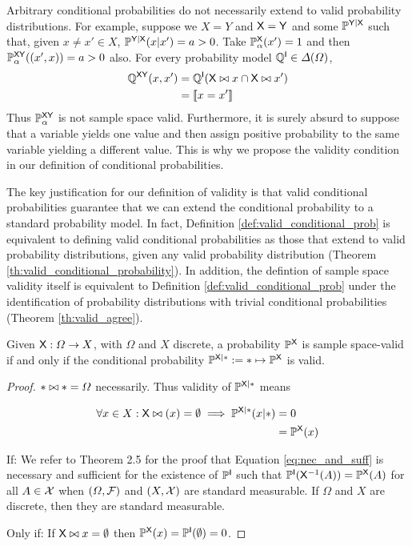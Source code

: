 Arbitrary conditional probabilities do not necessarily extend to valid probability distributions. For example, suppose we $X=Y$ and $\mathsf{X}=\mathsf{Y}$ and some $\mathbb{P}^{\mathsf{Y}|\mathsf{X}}$ such that, given $x\neq x'\in X$, $\mathbb{P}^{\mathsf{Y}|\mathsf{X}}(x|x')=a>0$. Take $\mathbb{P}_\alpha^{\mathsf{X}}(x')=1$ and then $\mathbb{P}_\alpha^{\mathsf{XY}}((x',x))=a>0$ also. For every probability model $\mathbb{Q}^{\mathsf{I}}\in \Delta(\Omega)$,
\begin{align}
\mathbb{Q}^{\mathsf{XY}}(x,x')&=\mathbb{Q}^{\mathsf{I}}(\mathsf{X}\bowtie x\cap\mathsf{X}\bowtie x')\\
&= \llbracket x=x' \rrbracket
\end{align}
Thus $\mathbb{P}_\alpha^{\mathsf{XY}}$ is not sample space valid. Furthermore, it is surely absurd to suppose that a variable yields one value and then assign positive probability to the same variable yielding a different value. This is why we propose the validity condition in our definition of conditional probabilities.

The key justification for our definition of validity is that valid conditional probabilities guarantee that we can extend the conditional probability to a standard probability model. In fact, Definition \ref{def:valid_conditional_prob} is equivalent to defining valid conditional probabilities as those that extend to valid probability distributions, given any valid probability distribution (Theorem \ref{th:valid_conditional_probability}). In addition, the defintion of sample space validity itself is equivalent to Definition \ref{def:valid_conditional_prob} under the identification of probability distributions with trivial conditional probabilities (Theorem \ref{th:valid_agree}).

\begin{theorem}\label{th:valid_agree}
Given $\mathsf{X}:\Omega\to X$, with $\Omega$ and $X$ discrete, a probability $\mathbb{P}^{\mathsf{X}}$ is sample space-valid if and only if the conditional probability $\mathbb{P}^{\mathsf{X}|*}:=*\mapsto \mathbb{P}^{\mathsf{X}}$ is valid.
\end{theorem}

\begin{proof}
$*\bowtie *=\Omega$ necessarily. Thus validity of $\mathbb{P}^{\mathsf{X}|*}$ means 

\begin{align}
	\forall x\in X: \mathsf{X}\bowtie (x)=\emptyset \implies \mathbb{P}^{\mathsf{X}|*}(x|*)&=0\\
	&= \mathbb{P}^{\mathsf{X}}(x)\label{eq:nec_and_suff}
\end{align}

If: We refer to \citet{ershov_extension_1975} Theorem 2.5 for the proof that Equation \ref{eq:nec_and_suff} is necessary and sufficient for the existence of $\mathbb{P}^{\mathsf{I}}$ such that $\mathbb{P}^{\mathsf{I}}(\mathsf{X}^{-1}(A))=\mathbb{P}^{\mathsf{X}}(A)$ for all $A\in \mathcal{X}$ when $(\Omega,\mathcal{F})$ and $(X,\mathcal{X})$ are standard measurable. If $\Omega$ and $X$ are discrete, then they are standard measurable.

Only if: If $\mathsf{X}\bowtie x=\emptyset$ then $\mathbb{P}^{\mathsf{X}}(x)=\mathbb{P}^{\mathsf{I}}(\emptyset)=0$.
\end{proof}


